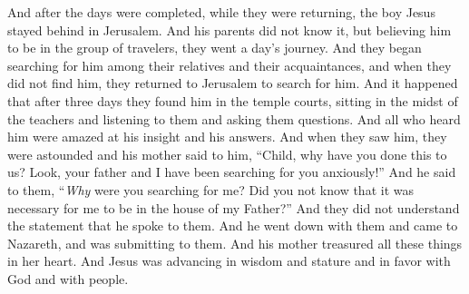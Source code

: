 \begin{biblechapter}
\verse And after the days were completed, while they were returning, the boy Jesus stayed behind in Jerusalem. And his parents did not know it,
\verse but believing him to be in the group of travelers, they went a day’s journey. And they began searching for him among their relatives and their acquaintances,
\verse and when they did not find him, they returned to Jerusalem to search for him.
\verse And it happened that after three days they found him in the temple courts, sitting in the midst of the teachers and listening to them and asking them questions.
\verse And all who heard him were amazed at his insight and his answers.
\verse And when they saw him, they were astounded and his mother said to him, “Child, why have you done this to us? Look, your father and I have been searching for you anxiously!”
\verse And he said to them, “\textit{Why} were you searching for me? Did you not know that it was necessary for me to be in the house of my Father?”
\verse And they did not understand the statement that he spoke to them.
\verse And he went down with them and came to Nazareth, and was submitting to them. And his mother treasured all these things in her heart.
\verse And Jesus was advancing in wisdom and stature and in favor with God and with people.
\end{biblechapter}

